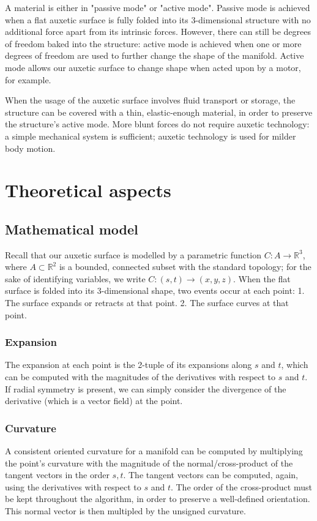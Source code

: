 \documentclass{article}
\begin{document}
A material is either in "passive mode" or "active mode". Passive mode is achieved when a flat auxetic surface is fully folded into its 3-dimensional structure with no additional force apart from its intrinsic forces. However, there can still be degrees of freedom baked into the structure: active mode is achieved when one or more degrees of freedom are used to further change the shape of the manifold. Active mode allows our auxetic surface to change shape when acted upon by a motor, for example.

When the usage of the auxetic surface involves fluid transport or storage, the structure can be covered with a thin, elastic-enough material, in order to preserve the structure's active mode. More blunt forces do not require auxetic technology: a simple mechanical system is sufficient; auxetic technology is used for milder body motion.


\section{Theoretical aspects}

\subsection{Mathematical model}
Recall that our auxetic surface is modelled by a parametric function $ C: A \rightarrow \mathbb{R}^3 $, where $A \subset \mathbb{R}^2$ is a bounded, connected subset with the standard topology; for the sake of identifying variables, we write $ C: (s, t) \rightarrow (x, y, z) $. When the flat surface is folded into its 3-dimensional shape, two events occur at each point:
1. The surface expands or retracts at that point.
2. The surface curves at that point.

\subsubsection{Expansion}
The expansion at each point is the 2-tuple of its expansions along $s$ and $t$, which can be computed with the magnitudes of the derivatives with respect to $s$ and $t$. If radial symmetry is present, we can simply consider the divergence of the derivative (which is a vector field) at the point.

\subsubsection{Curvature}
A consistent oriented curvature for a manifold can be computed by multiplying the point's curvature with the magnitude of the normal/cross-product of the tangent vectors in the order $s, t$. The tangent vectors can be computed, again, using the derivatives with respect to $s$ and $t$. The order of the cross-product must be kept throughout the algorithm, in order to preserve a well-defined orientation. This normal vector is then multipled by the unsigned curvature.
\end{document}
